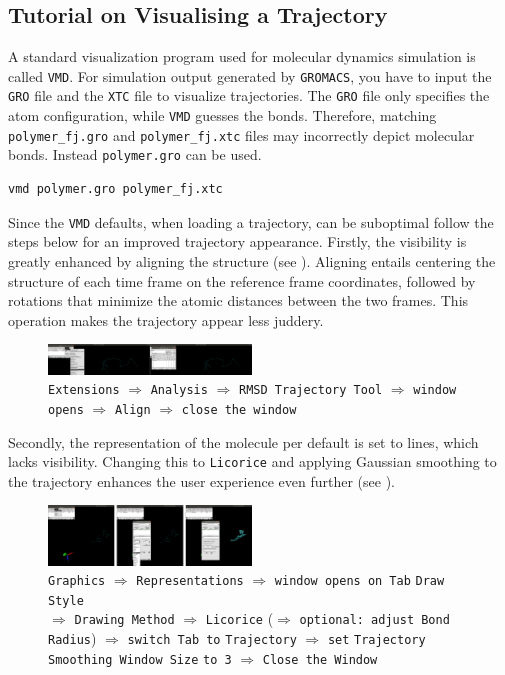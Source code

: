 \documentclass[9pt,tutorial]{livecoms}
\newcommand{\code}[1]{\colorbox{light-gray}{\texttt{#1}}}
\begin{document}
\subsection*{Tutorial on Visualising a Trajectory}
A standard visualization program used for molecular dynamics simulation is called \texttt{VMD}. For simulation output generated by \texttt{GROMACS}, you have to input the \texttt{GRO} file and the \texttt{XTC} file to visualize trajectories. The \texttt{GRO} file only specifies the atom configuration, while \texttt{VMD} guesses the bonds. Therefore, matching \code{polymer\_fj.gro} and \code{polymer\_fj.xtc} files may incorrectly depict molecular bonds. Instead \code{polymer.gro} can be used.
\begin{lstlisting}[language=bash]
vmd polymer.gro polymer_fj.xtc
\end{lstlisting}
Since the \texttt{VMD} defaults, when loading a trajectory, can be suboptimal follow the steps below for an improved trajectory appearance. Firstly, the visibility is greatly enhanced by aligning the structure (see ). Aligning entails centering the structure of each time frame on the reference frame coordinates, followed by rotations that minimize the atomic distances between the two frames. This operation makes the trajectory appear less juddery.\\
\begin{figure}[H]
	\centering
	\includegraphics[width=0.48\textwidth]{figures/tutorial1.png}
	\caption[aligning the molecule]{\code{Extensions} $\Rightarrow$ \code{Analysis} $\Rightarrow$ \code{RMSD Trajectory Tool} $\Rightarrow$ \texttt{window opens} $\Rightarrow$ \code{Align} $\Rightarrow$ \texttt{close the window}}
	\label{fig:tut1}
\end{figure}
Secondly, the representation of the molecule per default is set to lines, which lacks visibility. Changing this to \texttt{Licorice} and applying Gaussian smoothing to the trajectory enhances the user experience even further (see  ). 
\begin{figure}[H]
	\centering
	\includegraphics[width=0.48\textwidth]{figures/tutorial2.png}
	\caption[better drawing style]{\code{Graphics} $\Rightarrow$ \code{Representations} $\Rightarrow$ \texttt{window  opens on Tab} \code{Draw Style} \\$\Rightarrow$ \code{Drawing Method} $\Rightarrow$ \code{Licorice}  ($\Rightarrow$ \texttt{optional: adjust Bond Radius}) $\Rightarrow$ \texttt{switch Tab to} \code{Trajectory} $\Rightarrow$ \texttt{set} \code{Trajectory Smoothing Window Size} \texttt{to 3} $\Rightarrow$ \texttt{Close the Window}}
	\label{fig:tut2}
\end{figure}
\end{document}
